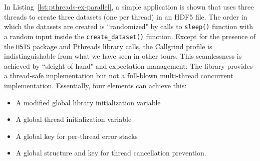 






In Listing~\ref{lst:pthreads-ex-parallel}, a simple application is shown that uses three threads to create three datasets (one per thread) in an HDF5 file. The order in which the datasets are created is ``randomized" by calls to \texttt{sleep()} function with a random input inside the \texttt{create\_dataset()} function. Except for the presence of the \texttt{H5TS} package and Pthreads library calls, the Callgrind profile is indistinguishable from what we have seen in other tours. This seamlessness is achieved by ``sleight of hand" and expectation management: The library provides a thread-safe implementation but not a full-blown multi-thread concurrent implementation. Essentially, four elements can achieve this:
\begin{itemize}
    \item A modified global library initialization variable
    \item A global thread initialization variable
    \item A global key for per-thread error stacks
    \item A global structure and key for thread cancellation prevention.
\end{itemize}


